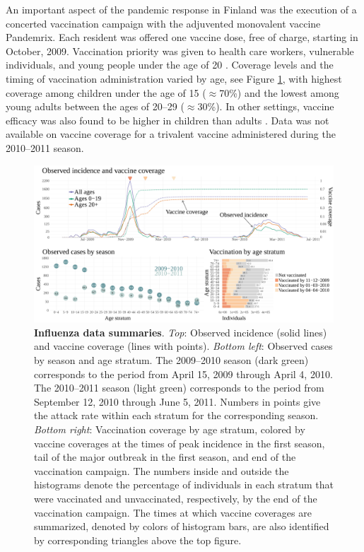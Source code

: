 An important aspect of the pandemic response in Finland was the execution of a concerted vaccination campaign with the adjuvented monovalent vaccine Pandemrix. Each resident was offered one vaccine dose, free of charge, starting in October, 2009. Vaccination priority was given to health care workers, vulnerable individuals, and young people under the age of 20 \cite{syrjanen2014effectiveness}. Coverage levels and the timing of vaccination administration varied by age, see Figure \ref{fig:finland_fludat_intro}, with highest coverage among children under the age of 15 ($ \approx $70\%) and the lowest among young adults between the ages of 20--29 ($ \approx $30\%). In other settings, vaccine efficacy was also found to be higher in children than adults \cite{lansbury2017effectiveness}. Data was not available on vaccine coverage for a trivalent vaccine administered during the 2010--2011 season. 

\begin{figure}
	\centering
	\includegraphics[width=\linewidth]{figures/fludat_plots}
	\caption[A(H1N1)pdm09 incidence and vaccination data from Finland, April 15, 2009 --- June 5, 2011.]{\textbf{Influenza data summaries}. \textit{Top}: Observed incidence (solid lines) and vaccine coverage (lines with points). \textit{Bottom left}: Observed cases by season and age stratum. The 2009--2010 season (dark green) corresponds to the period from April 15, 2009 through April 4, 2010. The 2010--2011 season (light green) corresponds to the period from September 12, 2010 through June 5, 2011. Numbers in points give the attack rate within each stratum for the corresponding season. \textit{Bottom right}: Vaccination coverage by age stratum, colored by vaccine coverages at the times of peak incidence in the first season, tail of the major outbreak in the first season, and end of the vaccination campaign. The numbers inside and outside the histograms denote the percentage of individuals in each stratum that were vaccinated and unvaccinated, respectively, by the end of the vaccination campaign. The times at which vaccine coverages are summarized, denoted by colors of histogram bars, are also identified by corresponding triangles above the top figure.}
	\label{fig:finland_fludat_intro}
\end{figure}

